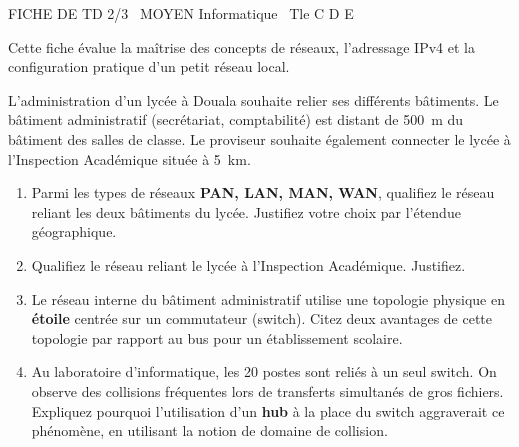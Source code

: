 \documentclass[11pt]{article}
\begin{document}
\begin{tcolorbox}[enhanced,colback=popink,colframe=popink,arc=10pt,boxrule=0pt,left=12pt,right=12pt,top=9pt,bottom=9pt]
{\color{white}\popxbold\small FICHE DE TD 2/3 \textbullet\ MOYEN \hfill Informatique \textbullet\ Tle C D E\par}
\end{tcolorbox}
\vspace{4pt}
Cette fiche évalue la maîtrise des concepts de réseaux, l'adressage IPv4 et la configuration pratique d'un petit réseau local.

\begin{exercice}
L'administration d'un lycée à Douala souhaite relier ses différents bâtiments. Le bâtiment administratif (secrétariat, comptabilité) est distant de \SI{500}{\meter} du bâtiment des salles de classe. Le proviseur souhaite également connecter le lycée à l'Inspection Académique située à \SI{5}{\kilo\meter}.

\begin{enumerate}
    \item Parmi les types de réseaux \textbf{PAN, LAN, MAN, WAN}, qualifiez le réseau reliant les deux bâtiments du lycée. Justifiez votre choix par l'étendue géographique.
    \item Qualifiez le réseau reliant le lycée à l'Inspection Académique. Justifiez.
    \item Le réseau interne du bâtiment administratif utilise une topologie physique en \textbf{étoile} centrée sur un commutateur (switch). Citez deux avantages de cette topologie par rapport au bus pour un établissement scolaire.
    \item Au laboratoire d'informatique, les 20 postes sont reliés à un seul switch. On observe des collisions fréquentes lors de transferts simultanés de gros fichiers. Expliquez pourquoi l'utilisation d'un \textbf{hub} à la place du switch aggraverait ce phénomène, en utilisant la notion de domaine de collision.
\end{enumerate}
\end{exercice}
\end{document}
